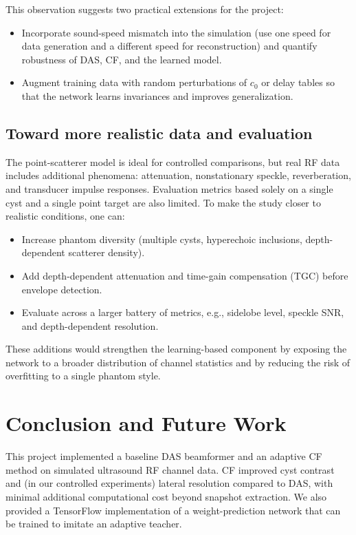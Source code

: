 \documentclass[conference]{IEEEtran}
\begin{document}
This observation suggests two practical extensions for the project:
\begin{itemize}
    \item Incorporate sound-speed mismatch into the simulation (use one speed for data generation and a different speed for reconstruction) and quantify robustness of DAS, CF, and the learned model.
    \item Augment training data with random perturbations of $c_0$ or delay tables so that the network learns invariances and improves generalization.
\end{itemize}

\subsection{Toward more realistic data and evaluation}
The point-scatterer model is ideal for controlled comparisons, but real RF data includes additional phenomena: attenuation, nonstationary speckle, reverberation, and transducer impulse responses. Evaluation metrics based solely on a single cyst and a single point target are also limited. To make the study closer to realistic conditions, one can:
\begin{itemize}
    \item Increase phantom diversity (multiple cysts, hyperechoic inclusions, depth-dependent scatterer density).
    \item Add depth-dependent attenuation and time-gain compensation (TGC) before envelope detection.
    \item Evaluate across a larger battery of metrics, e.g., sidelobe level, speckle SNR, and depth-dependent resolution.
\end{itemize}
These additions would strengthen the learning-based component by exposing the network to a broader distribution of channel statistics and by reducing the risk of overfitting to a single phantom style.

\section{Conclusion and Future Work}
This project implemented a baseline DAS beamformer and an adaptive CF method on simulated ultrasound RF channel data. CF improved cyst contrast and (in our controlled experiments) lateral resolution compared to DAS, with minimal additional computational cost beyond snapshot extraction. We also provided a TensorFlow implementation of a weight-prediction network that can be trained to imitate an adaptive teacher.
\end{document}
